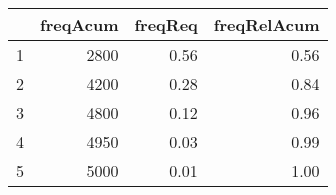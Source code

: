 \begin{table}[ht]
\centering
\begin{tabular}{rrrr}
  \hline
 & freqAcum & freqReq & freqRelAcum \\ 
  \hline
1 & 2800 & 0.56 & 0.56 \\ 
  2 & 4200 & 0.28 & 0.84 \\ 
  3 & 4800 & 0.12 & 0.96 \\ 
  4 & 4950 & 0.03 & 0.99 \\ 
  5 & 5000 & 0.01 & 1.00 \\ 
   \hline
\end{tabular}
\end{table}
